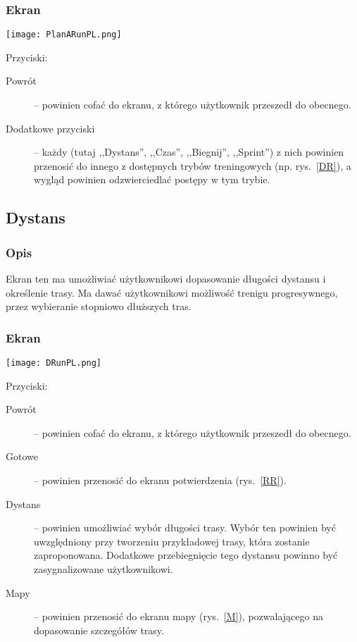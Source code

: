 \subsubsection{Ekran}
\begin{minipage}{0.5\textwidth}
  \label{PR}
  \texttt{[image: PlanARunPL.png]}
\end{minipage}
\begin{minipage}{0.5\textwidth}
Przyciski:\\
\begin{description}
  \item[Powrót] -- powinien cofać do ekranu, z którego użytkownik przeszedł do obecnego.
  \item[Dodatkowe przyciski] -- każdy (tutaj ,,Dystans'', ,,Czas'', ,,Biegnij'', ,,Sprint'') z nich powinien przenosić do innego z dostępnych trybów treningowych (np. rys.~\ref{DR}), a wygląd powinien odzwierciedlać postępy w tym trybie.
\end{description}
\end{minipage}
\subsection{Dystans}
\subsubsection{Opis}
\noindent Ekran ten ma umożliwiać użytkownikowi dopasowanie długości dystansu i określenie trasy. Ma dawać użytkownikowi możliwość trenigu progresywnego, przez wybieranie stopniowo dłuższych tras.
\subsubsection{Ekran}
\begin{minipage}{0.5\textwidth}
  \label{DR}
  \texttt{[image: DRunPL.png]}
\end{minipage}
\begin{minipage}{0.5\textwidth}
Przyciski:\\
\begin{description}
  \item[Powrót] -- powinien cofać do ekranu, z którego użytkownik przeszedł do obecnego.
  \item[Gotowe] -- powinien przenosić do ekranu potwierdzenia (rys.~\ref{RR}).
  \item[Dystans] -- powinien umożliwiać wybór długości trasy. Wybór ten powinien być uwzględniony przy tworzeniu przykładowej trasy, która zostanie zaproponowana. Dodatkowe przebiegnięcie tego dystansu powinno być zasygnalizowane użytkownikowi.
  \item[Mapy] -- powinien przenosić do ekranu mapy (rys.~\ref{M}), pozwalającego na dopasowanie szczegółów trasy.
\end{description}
\end{minipage}
